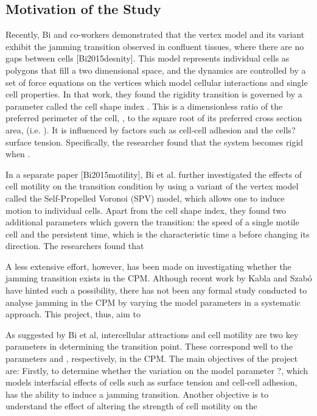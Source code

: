\documentclass[a4paper,12pt]{article}
\begin{document}
\subsection{Motivation of the Study}
Recently, Bi and co-workers demonstrated that the vertex model and its variant exhibit the jamming transition observed in confluent tissues, where there are no gaps between cells [Bi2015desnity]. This model represents individual cells as polygons that fill a two dimensional space, and the dynamics are controlled by a set of force equations on the vertices which model cellular interactions and single cell properties. In that work, they found the rigidity transition is governed by a parameter called the cell shape index . This is a dimensionless ratio of the preferred perimeter of the cell, , to the square root of its preferred cross section area,   (i.e. ). It is influenced by factors such as cell-cell adhesion and the cells? surface tension. Specifically, the researcher found that the system becomes rigid when . 

In a separate paper [Bi2015motility], Bi et al. further investigated the effects of cell motility on the transition condition by using a variant of the vertex model called the Self-Propelled Voronoi (SPV) model, which allows one to induce motion to individual cells. Apart from the cell shape index, they found two additional parameters which govern the transition: the speed of a single motile cell and the persistent time, which is the characteristic time a  before changing its direction. The researchers found that

A less extensive effort, however, has been made on investigating whether the jamming transition exists in the CPM. Although recent work by Kabla \cite{kabla2012} and Szab\'o \cite{szabo2010} have hinted such a possibility, there has not been any formal study conducted to analyse jamming in the CPM by varying the model parameters in a systematic approach. This project, thus, aim to 

As suggested by Bi et al, intercellular attractions and cell motility are two key parameters in determining the transition point. These correspond well to the parameters  and , respectively, in the CPM. The main objectives of the project are: Firstly, to determine whether the variation on the model parameter ?, which models interfacial effects of cells such as surface tension and cell-cell adhesion, has the ability to induce a jamming transition. Another objective is to understand the effect of altering the strength of cell motility on the 
\end{document}
